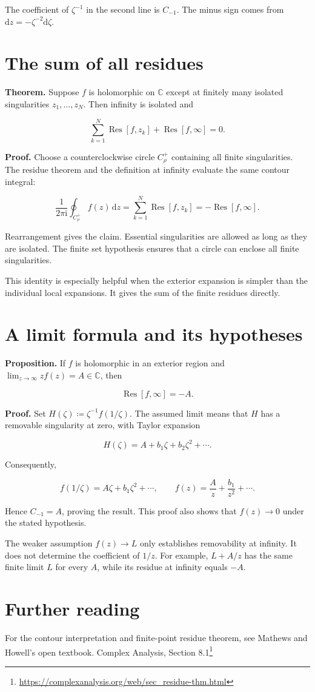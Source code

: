 \documentclass[11pt,a4paper]{article}
\theoremstyle{definition}
\theoremstyle{plain}
\begin{document}
The coefficient of $\zeta^{-1}$ in the second line is $C_{-1}$. The minus sign comes from $\mathrm{d}z=-\zeta^{-2}\mathrm{d}\zeta$.

\section{The sum of all residues}

\textbf{Theorem.} Suppose $f$ is holomorphic on $\mathbb C$ except at finitely many isolated singularities $z_1,\ldots,z_N$. Then infinity is isolated and

\[
\sum_{k=1}^{N}\operatorname{Res}[f,z_k]+\operatorname{Res}[f,\infty]=0.
\]

\textbf{Proof.} Choose a counterclockwise circle $C_\rho^+$ containing all finite singularities. The residue theorem and the definition at infinity evaluate the same contour integral:

\[
\frac1{2\pi\mathrm{i}}\oint_{C_\rho^+}f(z)\,\mathrm{d}z
=\sum_{k=1}^{N}\operatorname{Res}[f,z_k]
=-\operatorname{Res}[f,\infty].
\]

Rearrangement gives the claim. Essential singularities are allowed as long as they are isolated. The finite set hypothesis ensures that a circle can enclose all finite singularities.

This identity is especially helpful when the exterior expansion is simpler than the individual local expansions. It gives the sum of the finite residues directly.

\section{A limit formula and its hypotheses}

\textbf{Proposition.} If $f$ is holomorphic in an exterior region and $\lim_{z\to\infty}zf(z)=A\in\mathbb C$, then

\[
\operatorname{Res}[f,\infty]=-A.
\]

\textbf{Proof.} Set $H(\zeta)\coloneqq \zeta^{-1}f(1/\zeta)$. The assumed limit means that $H$ has a removable singularity at zero, with Taylor expansion

\[
H(\zeta)=A+b_1\zeta+b_2\zeta^2+\cdots.
\]

Consequently,

\[
f(1/\zeta)=A\zeta+b_1\zeta^2+\cdots,
\qquad
f(z)=\frac A z+\frac{b_1}{z^2}+\cdots.
\]

Hence $C_{-1}=A$, proving the result. This proof also shows that $f(z)\to0$ under the stated hypothesis.

The weaker assumption $f(z)\to L$ only establishes removability at infinity. It does not determine the coefficient of $1/z$. For example, $L+A/z$ has the same finite limit $L$ for every $A$, while its residue at infinity equals $-A$.

\section{Further reading}

For the contour interpretation and finite-point residue theorem, see Mathews and Howell's open textbook. Complex Analysis, Section 8.1\footnote{\url{https://complexanalysis.org/web/sec_residue-thm.html}}
\end{document}
